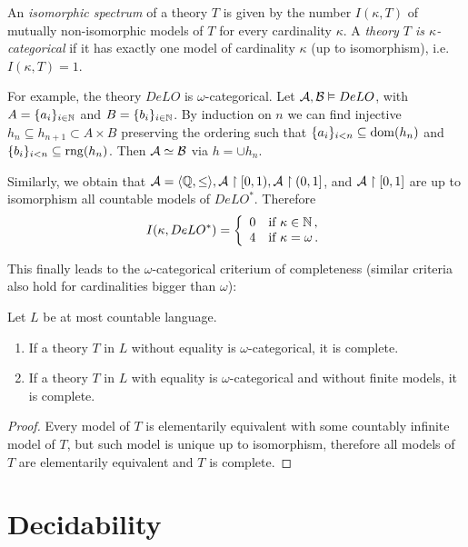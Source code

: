 An \emph{isomorphic spectrum} of a theory $T$ is given by the number $I(\kappa, T)$ of mutually non-isomorphic models of $T$ for every cardinality $\kappa$. A \emph{theory $T$ is $\kappa$-categorical} if it has exactly one model of cardinality $\kappa$ (up to isomorphism), i.e. $I(\kappa, T) = 1$. 

For example, the theory $DeLO$ is $\omega$-categorical. Let $\mathcal{A}, \mathcal{B} \vDash DeLO$, with $A = \{a_i\}_{i \in \mathbb{N}}$ and $B = \{b_i\}_{i \in \mathbb{N}}$. By induction on $n$ we can find injective $h_n \subseteq h_{n+1} \subset A \times B$ preserving the ordering such that $\{a_i\}_{i < n} \subseteq \operatorname{dom}(h_n)$ and $\{b_i\}_{i<n} \subseteq \operatorname{rng}(h_n)$. Then $\mathcal{A} \simeq \mathcal{B}$ via $h = \cup h_n$.

Similarly, we obtain that $\mathcal{A} = \langle \mathbb{Q}, \leq \rangle, \mathcal{A} \upharpoonright [0, 1), \mathcal{A} \upharpoonright (0, 1]$, and $\mathcal{A} \upharpoonright [0, 1]$ are up to isomorphism all countable models of $DeLO^*$. Therefore $$I(\kappa, DeLO^*) = \left\{ \begin{array}{ll} 0 & \text{if } \kappa \in \mathbb{N}\,, \\ 4 & \text{if } \kappa = \omega\,. \end{array} \right.$$

This finally leads to the $\omega$-categorical criterium of completeness (similar criteria also hold for cardinalities bigger than $\omega$):

\begin{theorem}
Let $L$ be at most countable language.
\begin{enumerate}
	\item If a theory $T$ in $L$ without equality is $\omega$-categorical, it is complete.
	\item If a theory $T$ in $L$ with equality is $\omega$-categorical and without finite models, it is complete.
\end{enumerate}
\end{theorem}
\begin{proof}
Every model of $T$ is elementarily equivalent with some countably infinite model of $T$, but such model is unique up to isomorphism, therefore all models of $T$ are elementarily equivalent and $T$ is complete.
\end{proof}

\section{Decidability}

